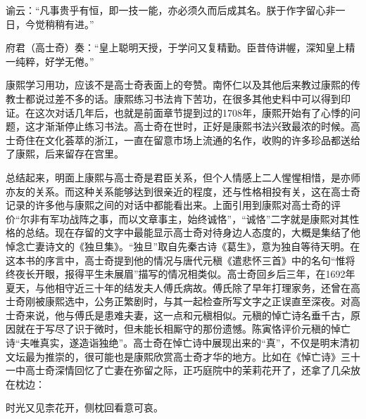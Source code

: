 
\begin{bookquote}谕云：“凡事贵乎有恒，即一技一能，亦必须久而后成其名。朕于作字留心非一日，今觉稍稍有进。”\end{bookquote}


\begin{bookquote}府君（高士奇）奏：“皇上聪明天授，于学问又复精勤。臣昔侍讲幄，深知皇上精一纯粹，好学无倦。”\end{bookquote}


康熙学习用功，应该不是高士奇表面上的夸赞。南怀仁以及其他后来教过康熙的传教士都说过差不多的话。康熙练习书法肯下苦功，在很多其他史料中可以得到印证。在这次对话几年后，也就是前面章节提到过的1708年，康熙开始有了心悸的问题，这才渐渐停止练习书法。高士奇在世时，正好是康熙书法兴致最浓的时候。高士奇住在文化荟萃的浙江，一直在留意市场上流通的名作，收购的许多珍品都送给了康熙，后来留存在宫里。



总结起来，明面上康熙与高士奇是君臣关系，但个人情感上二人惺惺相惜，是亦师亦友的关系。而这种关系能够达到很亲近的程度，还与性格相投有关，这在高士奇记录的许多他与康熙之间的对话中都能看出来。上面引用到康熙对高士奇的评价“尔非有军功战阵之事，而以文章事主，始终诚恪”，“诚恪”二字就是康熙对其性格的总结。现在存留的文字中最能显示高士奇对待身边人态度的，大概是集结了他悼念亡妻诗文的《独旦集》。“独旦”取自先秦古诗《葛生》，意为独自等待天明。在这本书的序言中，高士奇提到他的情况与唐代元稹《遣悲怀三首》中的名句“惟将终夜长开眼，报得平生未展眉”描写的情况相类似。高士奇回乡后三年，在1692年夏天，与他相守近三十年的结发夫人傅氏病故。傅氏除了早年打理家务，还曾在高士奇刚被康熙选中，公务正繁剧时，与其一起检查所写文字之正误直至深夜。对高士奇来说，他与傅氏是患难夫妻，这一点和元稹相似。元稹的悼亡诗名垂千古，原因就在于写尽了识于微时，但未能长相厮守的那份遗憾。陈寅恪评价元稹的悼亡诗“夫唯真实，遂造诣独绝”。高士奇在悼亡诗中展现出来的“真”，不仅是明末清初文坛最为推崇的，很可能也是康熙欣赏高士奇才华的地方。比如在《悼亡诗》三十一中高士奇深情回忆了亡妻在弥留之际，正巧庭院中的茉莉花开了，还拿了几朵放在枕边：



\begin{bookquote}时光又见柰花开，侧枕回看意可哀。\end{bookquote}


